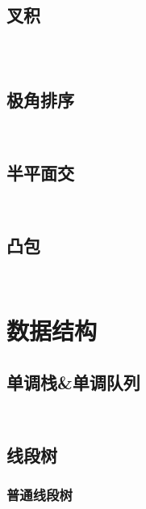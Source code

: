\documentclass[a4paper,11pt]{article}
\begin{document}
{\subsection{叉积} %
\inputminted[breaklines]{c++}{计算几何/叉积/点线式.cpp} %
\inputminted[breaklines]{c++}{计算几何/叉积/重载版.cpp} %
\inputminted[breaklines]{c++}{计算几何/叉积/叉积算多边形面积.cpp} %
\subsection{极角排序} %
\inputminted[breaklines]{c++}{计算几何/极角排序/atan2函数计算.cpp} %
\inputminted[breaklines]{c++}{计算几何/极角排序/叉积计算.cpp} %
\subsection{半平面交} %
\inputminted[breaklines]{c++}{计算几何/半平面交/半平面交存点.cpp} %
\inputminted[breaklines]{c++}{计算几何/半平面交/判不等式组是否有解.cpp} %
\subsection{凸包} %
\inputminted[breaklines]{c++}{计算几何/凸包/一般凸包.cpp} %
\inputminted[breaklines]{c++}{计算几何/凸包/最大空凸包.cpp} %

\newpage
\section{数据结构} %
\subsection{单调栈&单调队列} %
\inputminted[breaklines]{c++}{数据结构/单调栈&单调队列/单调栈.cpp} %
\inputminted[breaklines]{c++}{数据结构/单调栈&单调队列/单调队列.cpp} %
\subsection{线段树} %
\subsubsection{普通线段树} %
\inputminted[breaklines]{c++}{数据结构/线段树/普通线段树/单点修改&区间查询.cpp} %
\inputminted[breaklines]{c++}{数据结构/线段树/普通线段树/区间修改&区间查询.cpp} %
\inputminted[breaklines]{c++}{数据结构/线段树/普通线段树/区间修改&区间查询_矩阵ver.cpp} %
\inputminted[breaklines]{c++}{数据结构/线段树/普通线段树/区间染色.cpp} %
}
\end{document}
